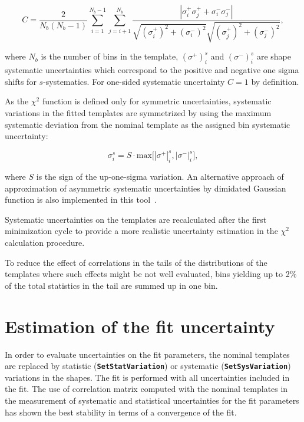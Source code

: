 \documentclass[12pt]{article}
\newcommand\verbbf[1]{\textcolor[rgb]{0,0,1}{\texttt{\textbf{#1}}}}
\begin{document}
\begin{equation}
C = \frac{2}{N_{b}(N_{b}-1)} \sum\limits_{i=1}^{N_{b}-1}
\sum\limits_{j=i+1}^{N_{b}} \frac{|\sigma_{i}^{+}\sigma_{j}^{+} +
\sigma_{i}^{-}\sigma_{j}^{-}|}
{\sqrt{(\sigma_{i}^{+})^{2} + (\sigma_{i}^{-})^{2}}
\sqrt{(\sigma_{j}^{+})^{2} + (\sigma_{j}^{-})^{2}} },
\end{equation}

\noindent where $N_{b}$ is the number of bins in the template, 
$(\sigma^{+})_{i}^{s}$ and $(\sigma^{-})_{i}^{s}$ are
shape systematic uncertainties which correspond to the positive and negative
one sigma shifts for $s$-systematics. 
For one-sided systematic uncertainty $C = 1$ by definition.

As the $\chi^2$ function is defined only for symmetric
uncertainties, systematic variations in the fitted templates are
symmetrized by using the maximum systematic deviation from the nominal
template as the assigned bin systematic uncertainty:

\begin{equation}
\sigma_{i}^{s} = S \cdot \mathrm{max}
\bigg[|\sigma^{+}|_{i}^{s},|\sigma^{-}|_{i}^{s}\bigg],
\end{equation}

\noindent where $S$ is the sign of the
up-one-sigma variation. An alternative approach of approximation of
asymmetric systematic uncertainties by dimidated Gaussian function is
also implemented in this tool~\cite{Barlow}.

Systematic uncertainties on the templates are recalculated after the
first minimization cycle to provide a more realistic
uncertainty estimation in the $\chi^2$ calculation procedure.

To reduce the effect of correlations in the tails of the distributions
of the templates where such effects might be not well evaluated, bins
yielding up to 2\% of the total statistics in the tail are summed up in one bin.

\section{Estimation of the fit uncertainty}

In order to evaluate uncertainties on the fit parameters, the nominal
templates are replaced by statistic (\verbbf{SetStatVariation}) or systematic
(\verbbf{SetSysVariation}) variations in the
shapes. The fit is performed with all uncertainties included in the fit.
The use of correlation matrix computed with the nominal templates in the
measurement of systematic and statistical uncertainties for the fit
parameters has shown the best stability in terms of a convergence of
the fit. 
\end{document}
